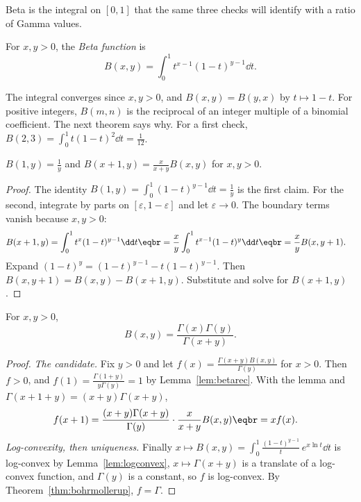 Beta is the integral on $[0,1]$ that the same three checks will identify with a ratio of Gamma values.

\begin{definition}
For $x,y>0$, the \emph{Beta function} is
\[
B(x,y)=\int_0^1t^{x-1}(1-t)^{y-1}\dd t.
\]
\end{definition}

The integral converges since $x,y>0$, and $B(x,y)=B(y,x)$ by $t\mapsto1-t$. For positive integers, $B(m,n)$ is the reciprocal of
an integer multiple of a binomial coefficient. The next theorem says why. For a first check, $B(2,3)=\int_0^1 t(1-t)^2\dd t=\frac1{12}$.

\begin{lemma}\label{lem:betarec}
$B(1,y)=\frac1y$ and $B(x+1,y)=\frac x{x+y}B(x,y)$ for $x,y>0$.
\end{lemma}
\begin{proof}
The identity $B(1,y)=\int_0^1(1-t)^{y-1}\dd t=\frac1y$ is the first claim. For the second, integrate by parts on $[\varepsilon,1-\varepsilon]$ and let $\varepsilon\to0$. The boundary terms vanish because $x,y>0$:
\[
\begin{aligned}B(x+1,y)&=\int_0^1t^x(1-t)^{y-1}\dd t\eqbr=\frac xy\int_0^1t^{x-1}(1-t)^y\dd t\eqbr=\frac xyB(x,y+1).\end{aligned}
\]
Expand $(1-t)^y=(1-t)^{y-1}-t(1-t)^{y-1}$. Then $B(x,y+1)=B(x,y)-B(x+1,y)$. Substitute and solve for $B(x+1,y)$.
\end{proof}

\begin{theorem}[Euler]\label{thm:betagamma}
For $x,y>0$,
\[
B(x,y)=\frac{\Gamma(x)\Gamma(y)}{\Gamma(x+y)}.
\]
\end{theorem}
\begin{proof}
\emph{The candidate.}
Fix $y>0$ and let $f(x)=\frac{\Gamma(x+y)B(x,y)}{\Gamma(y)}$ for $x>0$. Then $f>0$, and $f(1)=\frac{\Gamma(1+y)}{y\Gamma(y)}=1$ by
Lemma~\ref{lem:betarec}. With the lemma and $\Gamma(x+1+y)=(x+y)\Gamma(x+y)$,
\[
\begin{aligned}f(x+1)&=\frac{(x+y)\Gamma(x+y)}{\Gamma(y)}\cdot\frac x{x+y}B(x,y)\eqbr=xf(x).\end{aligned}
\]
\emph{Log-convexity, then uniqueness.}
Finally $x\mapsto B(x,y)=\int_0^1\frac{(1-t)^{y-1}}t\,e^{x\ln t}\dd t$ is log-convex by Lemma~\ref{lem:logconvex}, $x\mapsto\Gamma(x+y)$ is a
translate of a log-convex function, and $\Gamma(y)$ is a constant, so $f$ is log-convex. By Theorem~\ref{thm:bohrmollerup}, $f=\Gamma$.
\end{proof}

